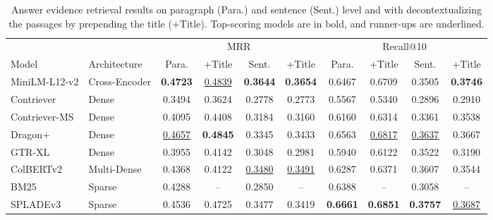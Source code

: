 \begin{table*}[htpb]
\small
\centering
\begin{tabular}{@{}llcccccccc@{}}
\toprule
 &  & \multicolumn{4}{c}{MRR} & \multicolumn{4}{c}{Recall@10} \\ \cmidrule(lr){3-6}
\cmidrule(lr){7-10}
 Model & Architecture & Para. & +Title & Sent. & +Title & Para. & +Title & Sent. & +Title \\ \midrule
MiniLM-L12-v2 & Cross-Encoder & \textbf{0.4723} & \underline{0.4839} & \textbf{0.3644} & \textbf{0.3654} & 0.6467 & 0.6709 & 0.3505 & \textbf{0.3746} \\
Contriever & Dense & 0.3494 & 0.3624 & 0.2778 & 0.2773 & 0.5567 & 0.5340 & 0.2896 & 0.2910 \\
Contriever-MS & Dense & 0.4095 & 0.4408 & 0.3184 & 0.3160 & 0.6160 & 0.6314 & 0.3361 & 0.3538 \\
Dragon+ & Dense & \underline{0.4657} & \textbf{0.4845} & 0.3345 & 0.3433 & 0.6563 & \underline{0.6817} & \underline{0.3637} & 0.3667 \\
GTR-XL & Dense & 0.3955 & 0.4142 & 0.3048 & 0.2981 & 0.5940 & 0.6122 & 0.3522 & 0.3190 \\
ColBERTv2 & Multi-Dense & 0.4368 & 0.4122 & \underline{0.3480} & \underline{0.3491} & 0.6287 & 0.6371 & 0.3607 & 0.3544 \\
BM25 & Sparse & 0.4288 & -- & 0.2850 & -- & 0.6388 & -- & 0.3058 & -- \\
SPLADEv3 & Sparse & 0.4536 & 0.4725 & 0.3477 & 0.3419 & \textbf{0.6661} & \textbf{0.6851} & \textbf{0.3757} & \underline{0.3687} \\
\bottomrule
\end{tabular}
\caption{Answer evidence retrieval results on paragraph (Para.) and sentence (Sent.) level and with decontextualizing the passages by prepending the title (+Title). Top-scoring models are in bold, and runner-ups are underlined.}
\label{tbl:evidnce-retrieval-results}
\end{table*}
